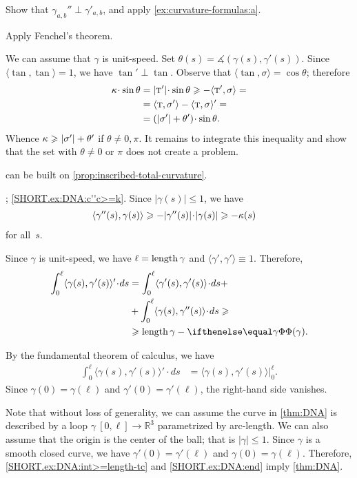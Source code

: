 \begin{multicols}{2}
Show that $\gamma_{a,b}''\perp \gamma'_{a,b}$, and apply \ref{ex:curvature-formulas:a}.

 Apply Fenchel's theorem.

We can assume that $\gamma$ is unit-speed.
Set $\theta(s)=\measuredangle(\gamma(s),\gamma'(s))$.
Since $\langle\tan,\tan\rangle=1$, we have $\tan'\perp \tan$.
Observe that $\langle \tan,\sigma\rangle=\cos\theta$;
therefore
\begin{align*}
\kur\cdot \sin\theta
&=|\tan'|\cdot \sin\theta\ge
-\langle \tan',\sigma\rangle=
\\
&=
\langle \tan,\sigma'\rangle-\langle \tan,\sigma\rangle'=
\\
&=
(|\sigma'|+\theta')\cdot \sin\theta.
\end{align*}
Whence $\kappa\geqslant |\sigma'|+\theta'$
if $\theta\ne0,\pi$.
It remains to integrate this inequality and show that the set with $\theta\ne0$ or $\pi$ does not create a problem.

 can be built on \ref{prop:inscribed-total-curvature}.

\parbf{\ref{ex:DNA}}; \ref{SHORT.ex:DNA:c''c>=k}.
Since $|\gamma(s)|\le 1$, we have
\begin{align*}
\langle\gamma''(s),\gamma(s)\rangle&\ge -|\gamma''(s)|\cdot|\gamma(s)|\ge-\kur(s)
\end{align*}
for all~$s$.

Since $\gamma$ is unit-speed, we have $\ell=\mathop{\rm length}\nolimits\gamma$ and $\langle\gamma',\gamma'\rangle\equiv1$.
Therefore,
\begin{align*}
\int_0^\ell\langle\gamma(s),\gamma'(s)\rangle'\cdot ds
&=
\int_0^\ell\langle\gamma'(s),\gamma'(s)\rangle\cdot ds+
\\
&+\int_0^\ell\langle\gamma(s),\gamma''(s)\rangle\cdot ds\ge
\\
&\ge \length\gamma-\tc\gamma.
\end{align*}

By the fundamental theorem of calculus, we have
\begin{align*}
\int_0^\ell\langle\gamma(s),\gamma'(s)\rangle'\cdot ds
&=\langle\gamma(s),\gamma'(s)\rangle\bigg|_0^\ell.
\end{align*}
Since $\gamma(0)=\gamma(\ell)$ and $\gamma'(0)=\gamma'(\ell)$, the right-hand side vanishes.


Note that without loss of generality, we can assume the curve in \ref{thm:DNA} is described by a loop $\gamma\:[0,\ell]\to\mathbb{R}^3$ parametrized by arc-length.
We can also assume that the origin is the center of the ball; that is $|\gamma|\le 1$.
Since $\gamma$ is a smooth closed curve, we have 
$\gamma'(0)=\gamma'(\ell)$ and $\gamma(0)=\gamma(\ell)$.
Therefore, \ref{SHORT.ex:DNA:int>=length-tc} and \ref{SHORT.ex:DNA:end} imply \ref{thm:DNA}.


\end{multicols}
